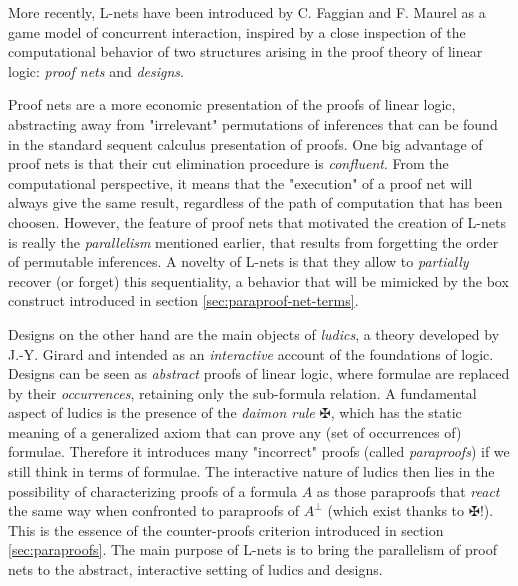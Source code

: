 \documentclass[12pt]{report}
\newcommand{\dai}{✠}
\begin{document}
More recently, L-nets have been introduced by C. Faggian and F. Maurel \cite{FM05} as a game model
of concurrent interaction, inspired by a close inspection of the computational behavior of two
structures arising in the proof theory of linear logic: \emph{proof nets} and \emph{designs}.

Proof nets are a more economic presentation of the proofs of linear logic, abstracting away from
"irrelevant" permutations of inferences that can be found in the standard sequent calculus
presentation of proofs. One big advantage of proof nets is that their cut elimination procedure is
\emph{confluent}. From the computational perspective, it means that the "execution" of a proof net
will always give the same result, regardless of the path of computation that has been choosen.
However, the feature of proof nets that motivated the creation of L-nets is really the
\emph{parallelism} mentioned earlier, that results from forgetting the order of permutable
inferences. A novelty of L-nets is that they allow to \emph{partially} recover (or forget) this
sequentiality, a behavior that will be mimicked by the box construct introduced in section
\ref{sec:paraproof-net-terms}.

Designs on the other hand are the main objects of \emph{ludics}, a theory developed by J.-Y. Girard
and intended as an \emph{interactive} account of the foundations of logic. Designs can be seen as
\emph{abstract} proofs of linear logic, where formulae are replaced by their \emph{occurrences},
retaining only the sub-formula relation. A fundamental aspect of ludics is the presence of the
\emph{daimon rule} $\mathsf{\dai}$, which has the static meaning of a generalized axiom that can
prove any (set of occurrences of) formulae. Therefore it introduces many "incorrect" proofs (called
\emph{paraproofs}) if we still think in terms of formulae. The interactive nature of ludics then
lies in the possibility of characterizing proofs of a formula $A$ as those paraproofs that
\emph{react} the same way when confronted to paraproofs of $A^\bot$ (which exist thanks to $\dai$!).
This is the essence of the counter-proofs criterion introduced in section \ref{sec:paraproofs}.
The main purpose of L-nets is to bring the parallelism of proof nets to the abstract, interactive
setting of ludics and designs.
\end{document}
